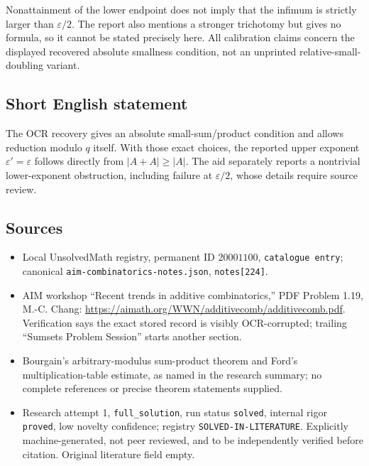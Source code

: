 \documentclass[11pt]{article}
\begin{document}
Nonattainment of the lower endpoint does not imply that the infimum is strictly larger than $\varepsilon/2$. The report also mentions a stronger trichotomy but gives no formula, so it cannot be stated precisely here. All calibration claims concern the displayed recovered absolute smallness condition, not an unprinted relative-small-doubling variant.
\subsection{Short English statement}
The OCR recovery gives an absolute small-sum/product condition and allows reduction modulo $q$ itself. With those exact choices, the reported upper exponent $\varepsilon'=\varepsilon$ follows directly from $|A+A|\geq|A|$. The aid separately reports a nontrivial lower-exponent obstruction, including failure at $\varepsilon/2$, whose details require source review.
\subsection{Sources}
\begin{itemize}
\item Local UnsolvedMath registry, permanent ID $20001100$, \texttt{catalogue entry}; canonical \texttt{aim-combinatorics-notes.json}, \texttt{notes[224]}.
\item AIM workshop ``Recent trends in additive combinatorics,'' PDF Problem 1.19, M.-C. Chang: \url{https://aimath.org/WWN/additivecomb/additivecomb.pdf}. Verification says the exact stored record is visibly OCR-corrupted; trailing ``Sumsets Problem Session'' starts another section.
\item Bourgain's arbitrary-modulus sum-product theorem and Ford's multiplication-table estimate, as named in the research summary; no complete references or precise theorem statements supplied.
\item Research attempt 1, \texttt{full\_solution}, run status \texttt{solved}, internal rigor \texttt{proved}, low novelty confidence; registry \texttt{SOLVED-IN-LITERATURE}. Explicitly machine-generated, not peer reviewed, and to be independently verified before citation. Original literature field empty.
\end{itemize}
\end{document}
